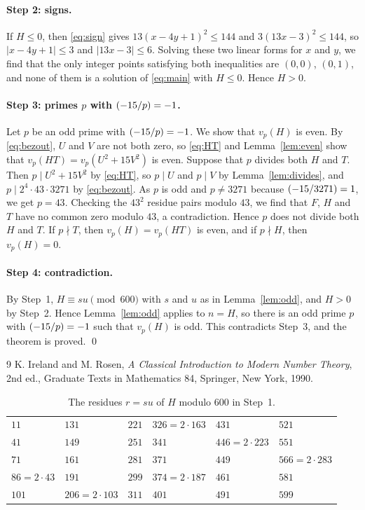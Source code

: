 \documentclass[11pt]{article}
\newcommand{\leg}[2]{\mathchoice{\biggl(\dfrac{#1}{#2}\biggr)}{(#1/#2)}{(#1/#2)}{(#1/#2)}}
\begin{document}
\paragraph{Step 2: signs.} If $H\leq0$, then \eqref{eq:sign} gives $13(x-4y+1)^2\leq 144$ and $3(13x-3)^2\leq 144$, so $|x-4y+1|\leq3$ and $|13x-3|\leq6$. Solving these two linear forms for $x$ and $y$, we find that the only integer points satisfying both inequalities are $(0,0)$, $(0,1)$, and none of them is a solution of \eqref{eq:main} with $H\leq0$. Hence $H>0$.

\paragraph{\texorpdfstring{Step 3: primes $p$ with $\leg{-15}{p}=-1$.}{Step 3: inert primes.}} Let $p$ be an odd prime with $\leg{-15}{p}=-1$. We show that $v_p(H)$ is even. By \eqref{eq:bezout}, $U$ and $V$ are not both zero, so \eqref{eq:HT} and Lemma~\ref{lem:even} show that $v_p(HT)=v_p(U^2+15V^2)$ is even. Suppose that $p$ divides both $H$ and $T$. Then $p\mid U^2+15V^2$ by \eqref{eq:HT}, so $p\mid U$ and $p\mid V$ by Lemma~\ref{lem:divides}, and $p\mid 2^{4}\cdot 43\cdot 3271$ by \eqref{eq:bezout}. As $p$ is odd and $p\neq3271$ because $\leg{-15}{3271}=1$, we get $p=43$. Checking the $43^2$ residue pairs modulo $43$, we find that $F$, $H$ and $T$ have no common zero modulo $43$, a contradiction. Hence $p$ does not divide both $H$ and $T$. If $p\nmid T$, then $v_p(H)=v_p(HT)$ is even, and if $p\nmid H$, then $v_p(H)=0$.

\paragraph{Step 4: contradiction.} By Step~1, $H\equiv su\pmod{600}$ with $s$ and $u$ as in Lemma~\ref{lem:odd}, and $H>0$ by Step~2. Hence Lemma~\ref{lem:odd} applies to $n=H$, so there is an odd prime $p$ with $\leg{-15}{p}=-1$ such that $v_p(H)$ is odd. This contradicts Step~3, and the theorem is proved.
\qed

\begin{thebibliography}{9}
 K. Ireland and M. Rosen, \emph{A Classical Introduction to Modern Number Theory}, 2nd ed., Graduate Texts in Mathematics 84, Springer, New York, 1990.
\end{thebibliography}

\begin{table}[ht]
\centering\footnotesize
\caption{The residues $r=su$ of $H$ modulo $600$ in Step~1.}\label{tab:res}
\begin{tabular}{llllll}
\hline
$11$ & $131$ & $221$ & $326=2\cdot163$ & $431$ & $521$\\
$41$ & $149$ & $251$ & $341$ & $446=2\cdot223$ & $551$\\
$71$ & $161$ & $281$ & $371$ & $449$ & $566=2\cdot283$\\
$86=2\cdot43$ & $191$ & $299$ & $374=2\cdot187$ & $461$ & $581$\\
$101$ & $206=2\cdot103$ & $311$ & $401$ & $491$ & $599$\\
\hline
\end{tabular}
\end{table}
\end{document}
